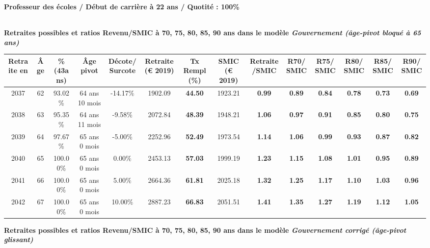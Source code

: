 {\bf \noindent Professeur des écoles / Début de carrière à 22 ans / Quotité : 100\%}  ~ 

 ~\\{\bf \noindent Retraites possibles et ratios Revenu/SMIC à 70, 75, 80, 85, 90 ans dans le modèle \emph{Gouvernement (âge-pivot bloqué à 65 ans)}}  
 
\begin{adjustbox}{max width=\textwidth} 
\begin{tabular}[htb]{|c|c||c|c|c||c|c||c|c||c|c|c|c|c|} 
\hline 
 Retraite en &  Âge &  \%(43ans) &  Âge pivot &  Décote/Surcote &  Retraite (\euro{} 2019) &  Tx Rempl(\%) &  SMIC (\euro{} 2019) &  Retraite/SMIC &  R70/SMIC &  R75/SMIC &  R80/SMIC &  R85/SMIC &  R90/SMIC \\ 
\hline \hline 
 2037 &  62 &  93.02\% &  64 ans 10 mois &  -14.17\% &  1902.09 &  {\bf 44.50} &  1923.21 &  {\bf {\color{red} 0.99}} &  {\bf {\color{red} 0.89}} &  {\bf {\color{red} 0.84}} &  {\bf {\color{red} 0.78}} &  {\bf {\color{red} 0.73}} &  {\bf {\color{red} 0.69}} \\ 
\hline 
 2038 &  63 &  95.35\% &  64 ans 11 mois &  -9.58\% &  2072.84 &  {\bf 48.39} &  1948.21 &  {\bf 1.06} &  {\bf {\color{red} 0.97}} &  {\bf {\color{red} 0.91}} &  {\bf {\color{red} 0.85}} &  {\bf {\color{red} 0.80}} &  {\bf {\color{red} 0.75}} \\ 
\hline 
 2039 &  64 &  97.67\% &  65 ans 0 mois &  -5.00\% &  2252.96 &  {\bf 52.49} &  1973.54 &  {\bf 1.14} &  {\bf 1.06} &  {\bf {\color{red} 0.99}} &  {\bf {\color{red} 0.93}} &  {\bf {\color{red} 0.87}} &  {\bf {\color{red} 0.82}} \\ 
\hline 
 2040 &  65 &  100.00\% &  65 ans 0 mois &  0.00\% &  2453.13 &  {\bf 57.03} &  1999.19 &  {\bf 1.23} &  {\bf 1.15} &  {\bf 1.08} &  {\bf 1.01} &  {\bf {\color{red} 0.95}} &  {\bf {\color{red} 0.89}} \\ 
\hline 
 2041 &  66 &  100.00\% &  65 ans 0 mois &  5.00\% &  2664.36 &  {\bf 61.81} &  2025.18 &  {\bf 1.32} &  {\bf 1.25} &  {\bf 1.17} &  {\bf 1.10} &  {\bf 1.03} &  {\bf {\color{red} 0.96}} \\ 
\hline 
 2042 &  67 &  100.00\% &  65 ans 0 mois &  10.00\% &  2887.23 &  {\bf 66.83} &  2051.51 &  {\bf 1.41} &  {\bf 1.35} &  {\bf 1.27} &  {\bf 1.19} &  {\bf 1.12} &  {\bf 1.05} \\ 
\hline 
\hline 
\end{tabular} 
\end{adjustbox} 
 
 \vspace{0.1cm} 
{\bf \noindent Retraites possibles et ratios Revenu/SMIC à 70, 75, 80, 85, 90 ans dans le modèle \emph{Gouvernement corrigé (âge-pivot glissant)}}  
 
